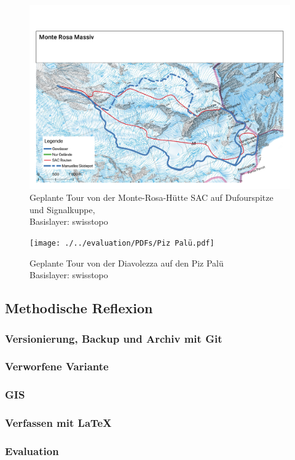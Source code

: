 \begin{Mappage}
{%
    \begin{figure}[H]
      \centering
      \includegraphics[page=1,width=.9\linewidth]{./../evaluation/PDFs/Monte Rosa Massiv.pdf}
      \caption{Geplante Tour von der Monte-Rosa-Hütte SAC auf Dufourspitze und Signalkuppe,\\Basislayer: swisstopo}\label{fig:monterosa}
    \end{figure}
    \begin{figure}[H]
      \centering
      \texttt{[image: ./../evaluation/PDFs/Piz Palü.pdf]}
      \caption{Geplante Tour von der Diavolezza auf den Piz Palü\\Basislayer: swisstopo}\label{fig:pizpalu}
    \end{figure}
}
\end{Mappage}

\subsection{Methodische Reflexion}
\subsubsection{Versionierung, Backup und Archiv mit Git}
\subsubsection{Verworfene Variante}
\subsubsection{GIS}
\subsubsection{Verfassen mit \LaTeX}
\subsubsection{Evaluation}


